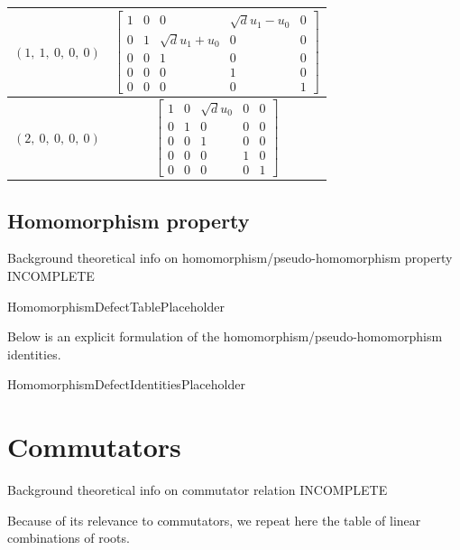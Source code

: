 \documentclass[11pt]{article}
\newcommand{\noi}{\noindent}
\theoremstyle{definition}
\begin{document}
\begin{tabular}{|l|c|}
    \hline
    $\left( 1, \  1, \  0, \  0, \  0\right)$ & $\left[\begin{matrix}1 & 0 & 0 & \sqrt{d} u_{1} - u_{0} & 0\\0 & 1 & \sqrt{d} u_{1} + u_{0} & 0 & 0\\0 & 0 & 1 & 0 & 0\\0 & 0 & 0 & 1 & 0\\0 & 0 & 0 & 0 & 1\end{matrix}\right]$ \\
    \hline
    $\left( 2, \  0, \  0, \  0, \  0\right)$ & $\left[\begin{matrix}1 & 0 & \sqrt{d} u_{0} & 0 & 0\\0 & 1 & 0 & 0 & 0\\0 & 0 & 1 & 0 & 0\\0 & 0 & 0 & 1 & 0\\0 & 0 & 0 & 0 & 1\end{matrix}\right]$ \\
    \hline
\end{tabular}


\subsection{Homomorphism property}

\noi Background theoretical info on homomorphism/pseudo-homomorphism property INCOMPLETE

\bigskip

HomomorphismDefectTablePlaceholder

\noi Below is an explicit formulation of the homomorphism/pseudo-homomorphism identities.

\bigskip

HomomorphismDefectIdentitiesPlaceholder

\newpage
\section{Commutators}

\noi Background theoretical info on commutator relation INCOMPLETE

\noi Because of its relevance to commutators, we repeat here the table of linear combinations of roots.
\end{document}
